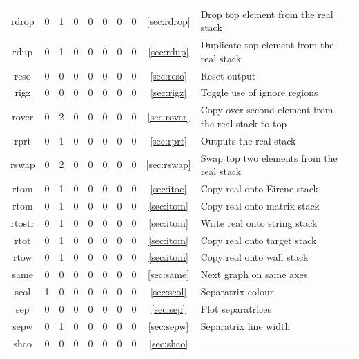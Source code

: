 \documentclass[a4paper,10pt]{report}
\begin{document}
\begin{center}
\begin{longtable}{|c|c|c|c|c|c|c|c|c|l|}
    rdrop \index{b2plot, rdrop}    & 0 & 1 & 0 & 0 & 0 & 0 & 0 & \ref{sec:rdrop}  & Drop top element from the real stack \\
    rdup \index{b2plot, rdup}      & 0 & 1 & 0 & 0 & 0 & 0 & 0 & \ref{sec:rdup}   & Duplicate top element from the real stack \\
    reso \index{b2plot, reso}      & 0 & 0 & 0 & 0 & 0 & 0 & 0 & \ref{sec:reso}   & Reset output \\
    rigz \index{b2plot, rigz}      & 0 & 0 & 0 & 0 & 0 & 0 & 0 & \ref{sec:rigz}   & Toggle use of ignore regions \\
    rover \index{b2plot, rover}    & 0 & 2 & 0 & 0 & 0 & 0 & 0 & \ref{sec:rover}  & Copy over second element from the real stack to top \\
    rprt \index{b2plot, rprt}      & 0 & 1 & 0 & 0 & 0 & 0 & 0 & \ref{sec:rprt}   & Outputs the real stack \\
    rswap \index{b2plot, rswap}    & 0 & 2 & 0 & 0 & 0 & 0 & 0 & \ref{sec:rswap}  & Swap top two elements from the real stack \\
    rtom \index{b2plot, rtoe}      & 0 & 1 & 0 & 0 & 0 & 0 & 0 & \ref{sec:itoe}   & Copy real onto Eirene stack \\
    rtom \index{b2plot, rtom}      & 0 & 1 & 0 & 0 & 0 & 0 & 0 & \ref{sec:itom}   & Copy real onto matrix stack \\
    rtostr \index{b2plot, rtostr}  & 0 & 1 & 0 & 0 & 0 & 0 & 0 & \ref{sec:itom}   & Write real onto string stack \\
    rtot \index{b2plot, rtot}      & 0 & 1 & 0 & 0 & 0 & 0 & 0 & \ref{sec:itom}   & Copy real onto target stack \\
    rtow \index{b2plot, rtow}      & 0 & 1 & 0 & 0 & 0 & 0 & 0 & \ref{sec:itom}   & Copy real onto wall stack \\
    same \index{b2plot, same}      & 0 & 0 & 0 & 0 & 0 & 0 & 0 & \ref{sec:same}   & Next graph on same axes \\
    scol \index{b2plot, scol}      & 1 & 0 & 0 & 0 & 0 & 0 & 0 & \ref{sec:scol}   & Separatrix colour \\
    sep \index{b2plot, sep}        & 0 & 0 & 0 & 0 & 0 & 0 & 0 & \ref{sec:sep}    & Plot separatrices \\
    sepw \index{b2plot, sepw}      & 0 & 1 & 0 & 0 & 0 & 0 & 0 & \ref{sec:sepw}   & Separatrix line width \\
    shco \index{b2plot, shco}      & 0 & 0 & 0 & 0 & 0 & 0 & 0 & \ref{sec:shco}   & \\

\end{longtable}
\end{center}
\end{document}
